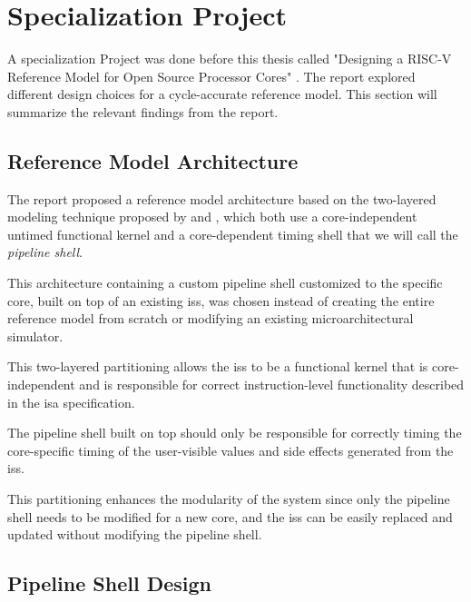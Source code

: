 \chapter{Specialization Project}
\label{ch:specialization}
\label{sec:specialization}

A specialization Project was done before this thesis called "Designing a RISC-V Reference Model for Open Source Processor Cores" \cite{torjenygaardeikenesDesigningRISCVReference2023}. The report explored different design choices for a cycle-accurate reference model. This section will summarize the relevant findings from the report.




\section{Reference Model Architecture}
\label{sec:pw_architecture}

The report proposed a reference model architecture based on the two-layered modeling technique proposed by \textcite{chiangEfficientTwolayeredCycleaccurate2009} and \textcite{leeFaCSimFastCycleAccurate2008}, which both use a core-independent untimed functional kernel and a core-dependent timing shell that we will call the \textit{pipeline shell}.

This architecture containing a custom pipeline shell customized to the specific core, built on top of an existing \acrshort{iss}, was chosen instead of creating the entire reference model from scratch or modifying an existing microarchitectural simulator. 

This two-layered partitioning allows the \acrshort{iss} to be a functional kernel that is core-independent and is responsible for correct instruction-level functionality described in the \acrshort{isa} specification. 

The pipeline shell built on top should only be responsible for correctly timing the core-specific timing of the user-visible values and side effects generated from the \acrshort{iss}. 

This partitioning enhances the modularity of the system since only the pipeline shell needs to be modified for a new core, and the \acrshort{iss} can be easily replaced and updated without modifying the pipeline shell. 


\section{Pipeline Shell Design}
\label{sec:pw_pipelineShellDesign}

